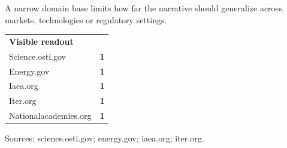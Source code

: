 \documentclass[10pt,a4paper]{article}
\begin{document}
\vspace{1pt}\noindent\begin{minipage}[t]{0.56\linewidth}
{\footnotesize\color{BOText} A narrow domain base limits how far the narrative should generalize across markets, technologies or regulatory settings.}\par
\end{minipage}\hfill\begin{minipage}[t]{0.36\linewidth}
{\scriptsize\color{BOText}\begin{tabular}{p{31mm}>{\raggedleft\arraybackslash}p{18mm}}
\multicolumn{2}{l}{\textcolor{BOGreen}{\bfseries Visible readout}}\\[2pt]
Science.osti.gov & \textbf{1}\\[1pt]
Energy.gov & \textbf{1}\\[1pt]
Iaea.org & \textbf{1}\\[1pt]
Iter.org & \textbf{1}\\[1pt]
Nationalacademies.org & \textbf{1}\\[1pt]
\end{tabular}}\par
\end{minipage}\par\vspace{1pt}
\par
{\scriptsize\color{BOMuted} Sources: science.osti.gov; energy.gov; iaea.org; iter.org.}\par
\end{document}

